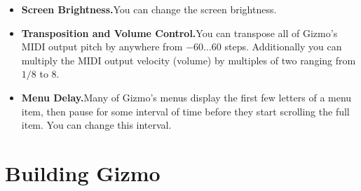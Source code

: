 \documentclass{article}
\begin{document}
\begin{itemize}
\item {\bf Screen Brightness.}\quad You can change the screen brightness.  


\item {\bf Transposition and Volume Control.}\quad You can transpose all of Gizmo's MIDI output pitch by anywhere from \(-60...60\) steps.  Additionally you can multiply the MIDI output velocity (volume) by multiples of two ranging from \(1/8\) to \(8\).

\item {\bf Menu Delay.}\quad Many of Gizmo's menus display the first few letters of a menu item, then pause for some interval of time before they start scrolling the full item.  You can change this interval.


\end{itemize} 

\clearpage

\section{Building Gizmo}
\end{document}
